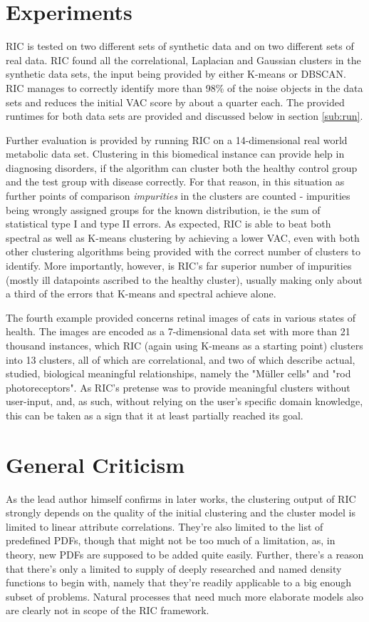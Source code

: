 \documentclass[conference]{IEEEtran}
\begin{document}
\section{Experiments}
\label{sec:exp}
RIC is tested on two different sets of synthetic data and on two different sets of real data. RIC found all the correlational, Laplacian and Gaussian clusters in the synthetic data sets, the input being provided by either K-means or DBSCAN\cite{Ester1996-rh}. RIC manages to correctly identify more than 98\% of the noise objects in the data sets and reduces the initial VAC score by about a quarter each. The provided runtimes for both data sets are provided and discussed below in section \ref{sub:run}.

Further evaluation is provided by running RIC on a 14-dimensional real world metabolic data set. Clustering in this biomedical instance can provide help in diagnosing disorders, if the algorithm can cluster both the healthy control group and the test group with disease correctly. For that reason, in this situation as further points of comparison \textit{impurities} in the clusters are counted - impurities being wrongly assigned groups for the known distribution, ie the sum of statistical type I and type II errors. As expected, RIC is able to beat both spectral as well as K-means clustering by achieving a lower VAC, even with both other clustering algorithms being provided with the correct number of clusters to identify. More importantly, however, is RIC's far superior number of impurities (mostly ill datapoints ascribed to the healthy cluster), usually making only about a third of the errors that K-means and spectral achieve alone.

The fourth example provided concerns retinal images of cats in various states of health. The images are encoded as a 7-dimensional data set with more than 21 thousand instances, which RIC (again using K-means as a starting point) clusters into 13 clusters, all of which are correlational, and two of which describe actual, studied, biological meaningful relationships, namely the "Müller cells" and "rod photoreceptors". As RIC's pretense was to provide meaningful clusters without user-input, and, as such, without relying on the user's specific domain knowledge, this can be taken as a sign that it at least partially reached its goal.

\section{General Criticism}
\label{sec:crit}
As the lead author himself confirms in later works\cite{Bohm2008-eh}\cite{Bohm2010-uu}, the clustering output of RIC strongly depends on the quality of the initial clustering and the cluster model is limited to linear attribute correlations. They're also limited to the list of predefined PDFs, though that might not be too much of a limitation, as, in theory, new PDFs are supposed to be added quite easily. Further, there's a reason that there's only a limited to supply of deeply researched and named density functions to begin with, namely that they're readily applicable to a big enough subset of problems. Natural processes that need much more elaborate models also are clearly not in scope of the RIC framework.
\end{document}
